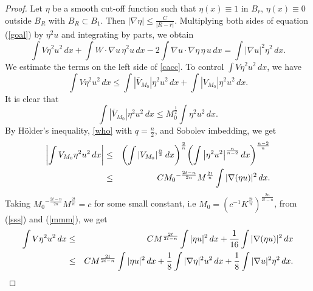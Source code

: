 \documentclass[11pt]{amsart}
\theoremstyle{plain}
\numberwithin{equation}{section}
\begin{document}
\begin{proof}
Let $\eta$ be a smooth cut-off function such that $\eta(x) \equiv 1$ in $B_r$,
$\eta(x) \equiv 0$ outside $B_R$ with $B_R\subset  B_1$. Then $|\nabla \eta|\leq \frac{C}{|R-r|}$.
Multiplying both sides of equation (\ref{goal}) by $\eta^2 u$ and integrating by parts, we obtain
\begin{equation}
\int V\eta^2 u^2 \, dx+\int W\cdot \nabla u \, \eta^2 u \, dx-2\int \nabla u\cdot\nabla \eta \, \eta \, u \, dx
=\int |\nabla u|^2 \eta^2 \,
dx.
\label{cacc}
\end{equation}
We estimate the terms on the left side of \eqref{cacc}. To
control $\int V\eta^2 u^2 \, dx$, we have
\begin{equation*}
\int V \eta^2 u^2\, dx \leq \int |{\overline{V}_{M_0}}|\eta^2 u^2 \,
dx+ \int |{{V}_{M_0}}|\eta^2 u^2 \, dx.
\end{equation*}
It is clear that
\begin{equation}
\int |{\overline{V}_{M_0}}|\eta^2 u^2 \, dx\leq
M_0^{\frac{1}{2}}\int \eta^2 u^2 \, dx.
\label{sss}
\end{equation}
By H\"older's inequality, \eqref{who} with $q=\frac{n}{2}$, and Sobolev imbedding, we get
\begin{eqnarray}
{\left\vert{\int {V}_{M_0}\eta^2 u^2 \, dx }\right\vert}
&\leq&{\left( {\int|{{V}_{M_0}}|^{\frac{n}{2}}\, dx} \right) }^{\frac{2}{n}}
{\left( {\int {\left\vert{\eta^2u^2}\right\vert}^{\frac{n}{n-2}}\, dx} \right) }^{\frac{n-2}{n}} \nonumber \medskip\\
&\leq & C {M_0}^{-\frac{2t-n}{2n}}M^{\frac{2t}{n}}\int |\nabla
(\eta u)|^2 \, dx. \label{mmm}
\end{eqnarray}
Taking ${M_0}^{-\frac{2t-n}{2n}}M^{\frac{2t}{n}}=c$ for some
small constant, i.e
$M_0=(c^{-1}K^{\frac{2t}{n}})^{\frac{2n}{2t-n}}$, from
(\ref{sss}) and (\ref{mmm}), we get
\begin{eqnarray}
\int V \eta^2 u^2\, dx & \leq & C M^{\frac{2t}{2t-n}}\int
|\eta u|^2 \, dx+\frac{1}{16}\int |\nabla (\eta u)|^2 \, dx
\nonumber
\medskip \\
& \leq &C M^{\frac{2t}{2t-n}}\int |\eta u|^2 \,
dx+\frac{1}{8}\int |\nabla \eta|^2 u^2 \, dx+\frac{1}{8}\int |\nabla
u|^2 \eta^2 \, dx.
\label{more1}
\end{eqnarray}


\end{proof}
\end{document}

